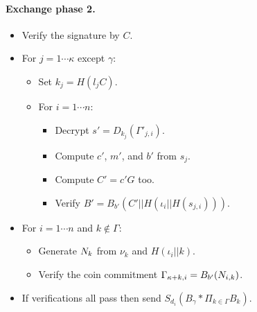 \documentclass{llncs}
\begin{document}
\paragraph{Exchange phase 2.}
\begin{itemize}
\item  Verify the signature by $C$.
\item  For $j = 1 \cdots \kappa$ except $\gamma$:
   \begin{itemize}
   \item  Set $k_j = H(l_j C)$.
   \item  For $i=1 \cdots n$:
      \begin{itemize}
      \item  Decrypt $s' = D_{k_j}(\Gamma'_{j,i})$.
      \item  Compute $c'$, $m'$, and $b'$ from $s_j$.
      \item  Compute $C' = c' G$ too.
      \item  Verify $B' = B_{b'}(C' || H(\iota_i || H(s_{j,i})))$.
      \end{itemize}
   \end{itemize}
\item  For $i=1 \cdots n$ and $k \not\in \Gamma$:
   \begin{itemize}
   \item  Generate $N_k$ from $\nu_k$ and $H(\iota_i || k)$.
   \item  Verify the coin commitment $\Gamma_{\kappa+k,i} = B_{b'}(N_{i,k})$.
   \end{itemize}
\item  If verifications all pass then send $S_{d_i}(B_\gamma * \Pi_{k \in \Gamma} B_k)$.
\end{itemize}









\end{document}
